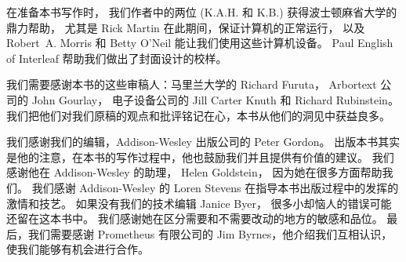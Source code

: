 在准备本书写作时，
我们作者中的两位 (K.A.H. 和 K.B.) 获得波士顿麻省大学的鼎力帮助，
尤其是 Rick Martin 在此期间，保证计算机的正常运行，
以及 Robert~A. Morris 和 Betty O'Neil 能让我们使用这些计算机设备。
Paul English of Interleaf 帮助我们做出了封面设计的校样。

我们需要感谢本书的这些审稿人：马里兰大学的 Richard Furuta，
Arbortext 公司的 John Gourlay，
电子设备公司的 Jill Carter Knuth 和 Richard Rubinstein。
我们把他们对我们原稿的观点和批评铭记在心，本书从他们的洞见中获益良多。

我们感谢我们的编辑，Addison-Wesley 出版公司的 Peter Gordon。
出版本书其实是他的注意，在本书的写作过程中，他也鼓励我们并且提供有价值的建议。
我们感谢他在 Addison-Wesley 的助理， Helen Goldstein， 因为她在很多方面帮助我们。
我们感谢 Addison-Wesley 的 Loren Stevens 在指导本书出版过程中的发挥的激情和技艺。
如果没有我们的技术编辑 Janice Byer， 很多小却恼人的错误可能还留在这本书中。
我们感谢她在区分需要和不需要改动的地方的敏感和品位。
最后，我们需要感谢 Prometheus 有限公司的 Jim Byrnes，他介绍我们互相认识，使我们能够有机会进行合作。
\baselineskip

